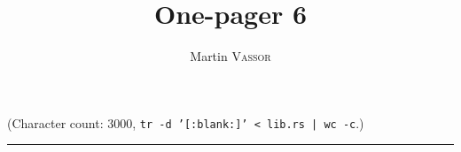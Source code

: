 \documentclass{article}
\title{One-pager 6}
\author{Martin \textsc{Vassor}}
\date{}
\begin{document}
\maketitle


{\color{gray} (Character count: 3000, \texttt{tr -d '[:blank:]' < lib.rs | wc -c}.)}
\begin{center}
	\rule{4cm}{0.4pt}
\end{center}


\end{document}
